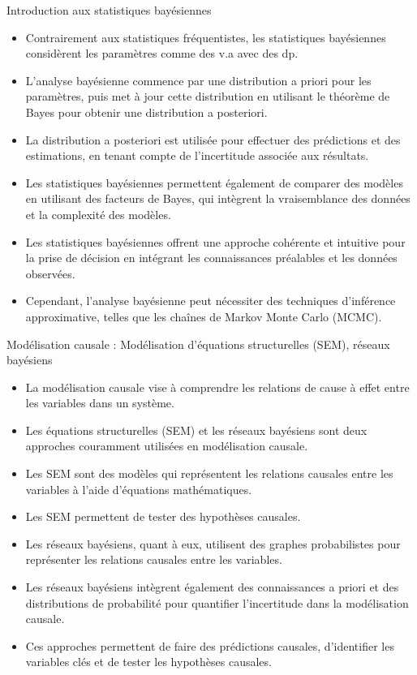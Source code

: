 \documentclass{beamer}
\begin{document}
\begin{frame}{Introduction aux statistiques bayésiennes}
	\begin{itemize}
		\item Contrairement aux statistiques fréquentistes, les statistiques bayésiennes considèrent les paramètres comme des v.a avec des dp.
		\item L'analyse bayésienne commence par une distribution a priori pour les paramètres, puis met à jour cette distribution en utilisant le théorème de Bayes pour obtenir une distribution a posteriori.
		\item La distribution a posteriori est utilisée pour effectuer des prédictions et des estimations, en tenant compte de l'incertitude associée aux résultats.
		\item Les statistiques bayésiennes permettent également de comparer des modèles en utilisant des facteurs de Bayes, qui intègrent la vraisemblance des données et la complexité des modèles.
		\item Les statistiques bayésiennes offrent une approche cohérente et intuitive pour la prise de décision en intégrant les connaissances préalables et les données observées.
		\item Cependant, l'analyse bayésienne peut nécessiter des techniques d'inférence approximative, telles que les chaînes de Markov Monte Carlo (MCMC).
	\end{itemize}
\end{frame}



\begin{frame}{Modélisation causale : Modélisation d'équations structurelles (SEM), réseaux bayésiens}
	\begin{itemize}
		\item La modélisation causale vise à comprendre les relations de cause à effet entre les variables dans un système.
		\item Les équations structurelles (SEM) et les réseaux bayésiens sont deux approches couramment utilisées en modélisation causale.
		\item Les SEM sont des modèles qui représentent les relations causales entre les variables à l'aide d'équations mathématiques.
		\item Les SEM permettent de tester des hypothèses causales.
		\item Les réseaux bayésiens, quant à eux, utilisent des graphes probabilistes pour représenter les relations causales entre les variables.
		\item Les réseaux bayésiens intègrent également des connaissances a priori et des distributions de probabilité pour quantifier l'incertitude dans la modélisation causale.
		\item Ces approches permettent de faire des prédictions causales, d'identifier les variables clés et de tester les hypothèses causales.
	\end{itemize}
\end{frame}
\end{document}
